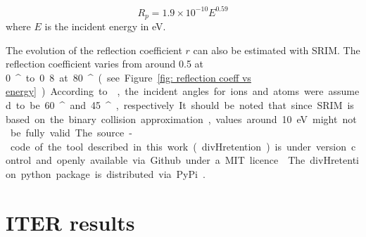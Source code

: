\begin{equation}
    R_p = 1.9\times 10^{-10} E ^{0.59}
    \label{eq: implantation range}
\end{equation}
where $E$ is the incident energy in \si{eV}.

The evolution of the reflection coefficient $r$ can also be estimated with SRIM.
The reflection coefficient varies from around 0.5 at \SI{0}{^\circ} to 0.8 at \SI{80}{^\circ} (see Figure \ref{fig: reflection coeff vs energy}).
According to \cite{park_assessment_2020}, the incident angles for ions and atoms were assumed to be \SI{60}{^\circ} and \SI{45}{^\circ}, respectively.
It should be noted that since SRIM is based on the binary collision approximation, values around \SI{10}{eV} might not be fully valid.

The source-code of the tool described in this work (divHretention) is under version control and openly available via Github under a MIT licence \cite{delaporte-mathurin_irfmdivhretention_2021}.
The divHretention python package is distributed via PyPi \cite{delaporte-mathurin_divhretention_nodate}.



\section{ITER results}






